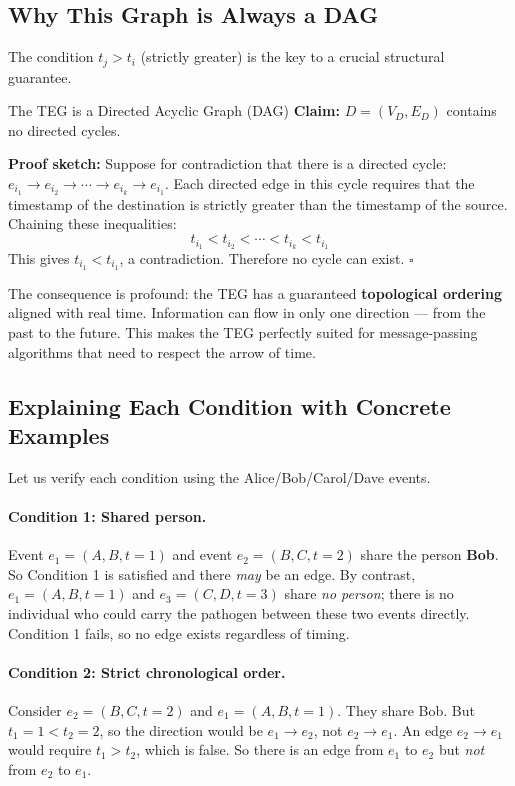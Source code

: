 \subsection{Why This Graph is Always a DAG}

The condition $t_j > t_i$ (strictly greater) is the key to a crucial structural
guarantee.

\begin{conceptbox}{The TEG is a Directed Acyclic Graph (DAG)}
\textbf{Claim:} $D = (V_D, E_D)$ contains no directed cycles.

\medskip
\noindent\textbf{Proof sketch:} Suppose for contradiction that there is a
directed cycle: $e_{i_1} \to e_{i_2} \to \cdots \to e_{i_k} \to e_{i_1}$.
Each directed edge in this cycle requires that the timestamp of the destination
is strictly greater than the timestamp of the source. Chaining these inequalities:
\[
    t_{i_1} < t_{i_2} < \cdots < t_{i_k} < t_{i_1}
\]
This gives $t_{i_1} < t_{i_1}$, a contradiction. Therefore no cycle can
exist. $\square$

\medskip
The consequence is profound: the TEG has a guaranteed \textbf{topological
ordering} aligned with real time. Information can flow in only one direction
--- from the past to the future. This makes the TEG perfectly suited for
message-passing algorithms that need to respect the arrow of time.
\end{conceptbox}

\subsection{Explaining Each Condition with Concrete Examples}

Let us verify each condition using the Alice/Bob/Carol/Dave events.

\paragraph{Condition 1: Shared person.}
Event $e_1=(A,B,t=1)$ and event $e_2=(B,C,t=2)$ share the person \textbf{Bob}.
So Condition 1 is satisfied and there \emph{may} be an edge. By contrast,
$e_1=(A,B,t=1)$ and $e_3=(C,D,t=3)$ share \emph{no person}; there is no
individual who could carry the pathogen between these two events directly.
Condition 1 fails, so no edge exists regardless of timing.

\paragraph{Condition 2: Strict chronological order.}
Consider $e_2=(B,C,t=2)$ and $e_1=(A,B,t=1)$. They share Bob. But $t_1 = 1 <
t_2 = 2$, so the direction would be $e_1 \to e_2$, not $e_2 \to e_1$. An edge
$e_2 \to e_1$ would require $t_1 > t_2$, which is false. So there is an edge
from $e_1$ to $e_2$ but \emph{not} from $e_2$ to $e_1$.

